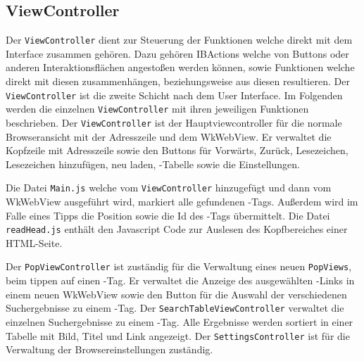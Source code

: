 
\subsection{ViewController}
Der \lstinline|ViewController| dient zur Steuerung der Funktionen welche direkt mit dem Interface zusammen gehören. Dazu gehören
IBActions welche von Buttons oder anderen Interaktionsflächen angestoßen werden können, sowie Funktionen welche direkt mit diesen zusammenhängen, beziehungsweise aus diesen resultieren. Der \lstinline|ViewController| ist die zweite Schicht nach dem User Interface. Im
Folgenden werden die einzelnen \lstinline|ViewController| mit ihren jeweiligen Funktionen beschrieben.
Der \lstinline|ViewController| ist der Hauptviewcontroller für die normale Browseransicht mit der Adresszeile und dem WkWebView. Er verwaltet die Kopfzeile mit Adresszeile sowie den Buttons für Vorwärts, Zurück, Lesezeichen, Lesezeichen hinzufügen, neu laden, \SECH-Tabelle sowie die Einstellungen. 

Die Datei \lstinline|Main.js| welche vom \lstinline|ViewController| hinzugefügt und dann vom WkWebView ausgeführt wird, markiert alle gefundenen \SEARCH-Tags. Außerdem wird im Falle eines Tipps die Position sowie die Id des \SEARCH-Tags übermittelt. Die Datei \lstinline|readHead.js| enthält den Javascript Code zur Auslesen des Kopfbereiches einer HTML-Seite.

Der \lstinline|PopViewController| ist zuständig für die Verwaltung eines neuen \lstinline|PopViews|, beim tippen auf einen \SEARCH-Tag. Er verwaltet die Anzeige des ausgewählten \SEARCH-Links in einem neuen WkWebView sowie den Button für die Auswahl der verschiedenen Suchergebnisse zu einem \SEARCH-Tag.
Der \lstinline|SearchTableViewController| verwaltet die einzelnen Suchergebnisse zu einem \SEARCH-Tag. Alle Ergebnisse werden sortiert in einer Tabelle mit Bild, Titel und Link angezeigt.
Der \lstinline|SettingsController| ist für die Verwaltung der Browsereinstellungen zuständig.